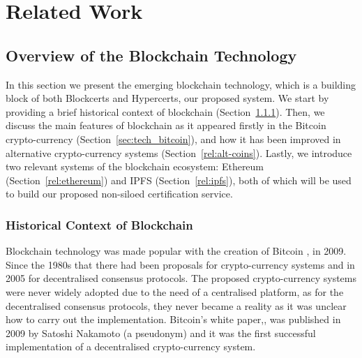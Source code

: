 
\section{Related Work}


\subsection{Overview of the Blockchain Technology}
\label{rel:bitcoin}

\noindent In this section we present the emerging blockchain technology, which is a building block of both Blockcerts and Hypercerts, our proposed system. We start by providing a brief historical context of blockchain (Section~\ref{sec:hist}). Then, we discuss the main features of blockchain as it appeared firstly in the Bitcoin crypto-currency (Section~\ref{sec:tech_bitcoin}), and how it has been improved in alternative crypto-currency systems (Section~\ref{rel:alt-coins}). Lastly, we introduce two relevant systems of the blockchain ecosystem: Ethereum (Section~\ref{rel:ethereum}) and IPFS (Section~\ref{rel:ipfs}), both of which will be used to build our proposed non-siloed certification service.

\subsubsection{Historical Context of Blockchain}
\label{sec:hist}

Blockchain technology was made popular with the creation of Bitcoin \cite{Anonymous:JOJGrvgg}, in 2009. Since the 1980s that there had been proposals for crypto-currency systems and in 2005 for decentralised consensus protocols. The proposed crypto-currency systems were never widely adopted due to the need of a centralised platform, as for the decentralised consensus protocols, they never became a reality as it was unclear how to carry out the implementation. Bitcoin's white paper,\cite{Anonymous:JOJGrvgg}, was published in 2009 by Satoshi Nakamoto (a pseudonym) and it was the first successful implementation of a decentralised crypto-currency system.

